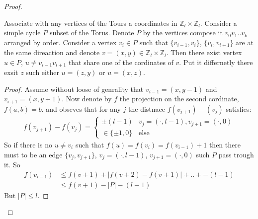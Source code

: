 \begin{proof}
  \begin{claim}
    \label{claim:inter}
    Associate with any vertices of the Tours a coordinates in $\mathbb{Z}_{l} \times \mathbb{Z}_{l}$. Consider a simple cycle $P$ subset of the Torus. Denote $P$ by the vertices compose it $v_{0}v_{1}..v_{k}$ arranged by order. Consider a  vertex $v_{i} \in P$ such that $\{v_{i-1}, v_{i}\}$, $\{v_{i}, v_{i+1}\}$ are at the same direaction and denote $v = \left( x,y \right) \in $$ \mathbb{Z}_{l} \times \mathbb{Z}_{l}$. Then there exist vertex $u \in P$, $ u \neq v_{i-1}v_{i+1}$ that share one of the cordinates of $v$. Put it differnetly there exsit $z$ such either  $u = \left( z,y \right)$ or $u = \left( x,z \right)$. 
  \end{claim}

  \begin{proof}
  Assume without loose of genrality that $v_{i-1} = \left( x, y -1 \right)$ and $v_{i+1} =\left( x,y+1 \right)$. Now denote by $f$ the projection on the second cordinate, $f(a,b)= b$. and obseves that for any $j$ the distnace $f\left( v_{j+1}\right) - \left( v_{j}  \right)$ satisfies:
    \begin{equation*}
      \begin{split}
      f\left( v_{j+1}\right) - f \left( v_{j}  \right) = 
        \begin{cases}
          \pm \left( l - 1 \right)  & v_{j} = \left( \cdot, l -1 \right), v_{j+1} = \left( \cdot, 0  \right)  \\
          \in \{ \pm 1 , 0\} & \text{else}
        \end{cases}
      \end{split}
    \end{equation*}
    So if there is no $u \neq v_{i}$ such that $f(u) = f(v_{i}) = f(v_{i-1})+1$ then there must to be an edge $\{v_{j},v_{j+1}\}$, $v_{j} = \left( \cdot, l -1 \right)$, $ v_{j+1} = \left( \cdot, 0  \right)$ such $P$ pass trough it. So  
    \begin{equation*}
      \begin{split}
        f\left( v_{i-1} \right) & \le f\left( v+1 \right) +  |f\left( v+2 \right) -  f\left( v+1 \right)| + .. + -\left( l - 1 \right) \\ 
        & \le f(v+1) - |P| - \left(l-1\right)  
      \end{split}
    \end{equation*}
    But $|P| \le l$. 
  \end{proof}
  \begin{figure}[h]
\end{figure}
\end{proof}
